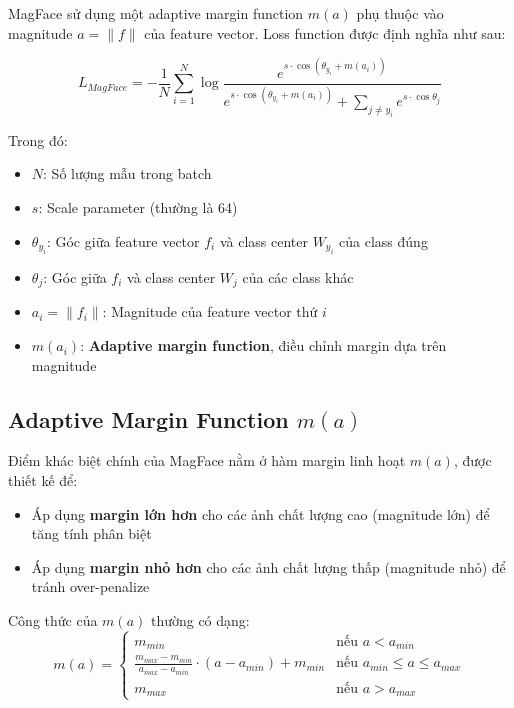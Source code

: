 MagFace sử dụng một adaptive margin function $m(a)$ phụ thuộc vào magnitude $a = \|f\|$ của feature vector. Loss function được định nghĩa như sau:

\begin{equation}
L_{MagFace} = -\frac{1}{N} \sum_{i=1}^{N} \log \frac{e^{s \cdot \cos(\theta_{y_i} + m(a_i))}}{e^{s \cdot \cos(\theta_{y_i} + m(a_i))} + \sum_{j \neq y_i} e^{s \cdot \cos\theta_j}}
\end{equation}

Trong đó:
\begin{itemize}
    \item $N$: Số lượng mẫu trong batch
    \item $s$: Scale parameter (thường là 64)
    \item $\theta_{y_i}$: Góc giữa feature vector $f_i$ và class center $W_{y_i}$ của class đúng
    \item $\theta_j$: Góc giữa $f_i$ và class center $W_j$ của các class khác
    \item $a_i = \|f_i\|$: Magnitude của feature vector thứ $i$
    \item $m(a_i)$: \textbf{Adaptive margin function}, điều chỉnh margin dựa trên magnitude
\end{itemize}

\subsection{Adaptive Margin Function $m(a)$}

Điểm khác biệt chính của MagFace nằm ở hàm margin linh hoạt $m(a)$, được thiết kế để:
\begin{itemize}
    \item Áp dụng \textbf{margin lớn hơn} cho các ảnh chất lượng cao (magnitude lớn) để tăng tính phân biệt
    \item Áp dụng \textbf{margin nhỏ hơn} cho các ảnh chất lượng thấp (magnitude nhỏ) để tránh over-penalize
\end{itemize}

Công thức của $m(a)$ thường có dạng:
\begin{equation}
m(a) = \begin{cases}
m_{min} & \text{nếu } a < a_{min} \\
\frac{m_{max} - m_{min}}{a_{max} - a_{min}} \cdot (a - a_{min}) + m_{min} & \text{nếu } a_{min} \leq a \leq a_{max} \\
m_{max} & \text{nếu } a > a_{max}
\end{cases}
\end{equation}

